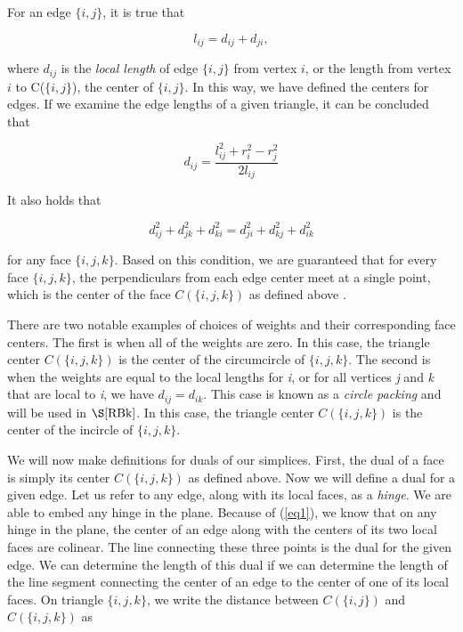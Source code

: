 \documentclass[12pt]{article}
\begin{document}
\noindent For an edge $\{i, j\}$, it is true that 

$$l_{ij} = d_{ij} + d_{ji},$$

\noindent where $d_{ij}$ is the \textit{local length} of edge $\{i, j\}$ from vertex $i$, or the length from vertex $i$ to C($\{i, j\}$), the center of $\{i, j\}$. In this way, we have defined the centers for edges. If we examine the edge lengths of a given triangle, it can be concluded that 

\begin{equation}
d_{ij} = \frac{l_{ij}^2 + r_i^2 - r_j^2}{2l_{ij}}
\label{eq2}
\end{equation}

\noindent It also holds that 

\begin{equation}
\label{eq1}
d_{ij}^2 + d_{jk}^2 + d_{ki}^2 = d_{ji}^2 + d_{kj}^2 + d_{ik}^2
\end{equation}

\noindent for any face $\{i, j, k\}$. Based on this condition, we are guaranteed that for every face $\{i, j, k\}$, the perpendiculars from each edge center meet at a single point, which is the center of the face $C(\{i, j, k\})$ as defined above \cite{Dave}.\newline

\noindent There are two notable examples of choices of weights and their corresponding face centers. The first is when all of the weights are zero. In this case, the triangle center $C(\{i, j, k\})$ is the center of the circumcircle of $\{i, j, k\}$. The second is when the weights are equal to the local lengths for \textit{i}, or for all vertices \textit{j} and \textit{k} that are local to \textit{i}, we have $d_{ij} = d_{ik}$. This case is known as a \textit{circle packing} and will be used in $\S\ref{RBk}$. In this case, the triangle center $C(\{i, j, k\})$ is the center of the incircle of $\{i, j, k\}$.\newline

\noindent We will now make definitions for duals of our simplices. First, the dual of a face is simply its center $C(\{i, j, k\})$ as defined above. Now we will define a dual for a given edge. Let us refer to any edge, along with its local faces, as a \textit{hinge}. We are able to embed any hinge in the plane. Because of (\ref{eq1}), we know that on any hinge in the plane, the center of an edge along with the centers of its two local faces are colinear. The line connecting these three points is the dual for the given edge. We can determine the length of this dual if we can determine the length of the line segment connecting the center of an edge to the center of one of its local faces. On triangle $\{i, j, k\}$, we write the distance between $C(\{i, j\})$ and $C(\{i, j, k\})$ as 
\end{document}
